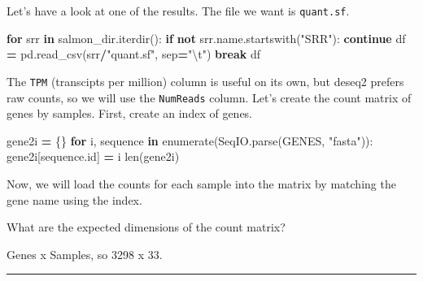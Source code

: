 \documentclass[
]{book}
\newenvironment{Shaded}{\begin{snugshade}}{\end{snugshade}}
\newcommand{\BuiltInTok}[1]{#1}
\newcommand{\CharTok}[1]{\textcolor[rgb]{0.31,0.60,0.02}{#1}}
\newcommand{\ControlFlowTok}[1]{\textcolor[rgb]{0.13,0.29,0.53}{\textbf{#1}}}
\newcommand{\KeywordTok}[1]{\textcolor[rgb]{0.13,0.29,0.53}{\textbf{#1}}}
\newcommand{\NormalTok}[1]{#1}
\newcommand{\OperatorTok}[1]{\textcolor[rgb]{0.81,0.36,0.00}{\textbf{#1}}}
\newcommand{\StringTok}[1]{\textcolor[rgb]{0.31,0.60,0.02}{#1}}
\begin{document}
Let's have a look at one of the results. The file we want is \texttt{quant.sf}.

\begin{Shaded}
\begin{Highlighting}[numbers=left,,]
\ControlFlowTok{for}\NormalTok{ srr }\KeywordTok{in}\NormalTok{ salmon\_dir.iterdir():}
    \ControlFlowTok{if} \KeywordTok{not}\NormalTok{ srr.name.startswith(}\StringTok{"SRR"}\NormalTok{): }\ControlFlowTok{continue}
\NormalTok{    df }\OperatorTok{=}\NormalTok{ pd.read\_csv(srr}\OperatorTok{/}\StringTok{"quant.sf"}\NormalTok{, sep}\OperatorTok{=}\StringTok{"}\CharTok{\textbackslash{}t}\StringTok{"}\NormalTok{)}
    \ControlFlowTok{break}
\NormalTok{df}
\end{Highlighting}
\end{Shaded}

The \texttt{TPM} (transcipts per million) column is useful on its own, but deseq2 prefers raw counts, so we will use the \texttt{NumReads} column.
Let's create the count matrix of genes by samples. First, create an index of genes.

\begin{Shaded}
\begin{Highlighting}[numbers=left,,]
\NormalTok{gene2i }\OperatorTok{=}\NormalTok{ \{\}}
\ControlFlowTok{for}\NormalTok{ i, sequence }\KeywordTok{in} \BuiltInTok{enumerate}\NormalTok{(SeqIO.parse(GENES, }\StringTok{"fasta"}\NormalTok{)):}
\NormalTok{    gene2i[sequence.}\BuiltInTok{id}\NormalTok{] }\OperatorTok{=}\NormalTok{ i}
\BuiltInTok{len}\NormalTok{(gene2i)}
\end{Highlighting}
\end{Shaded}

Now, we will load the counts for each sample into the matrix by matching the gene name using the index.

What are the expected dimensions of the count matrix?

Genes x Samples, so 3298 x 33.

\begin{center}\rule{0.5\linewidth}{0.5pt}\end{center}
\end{document}
